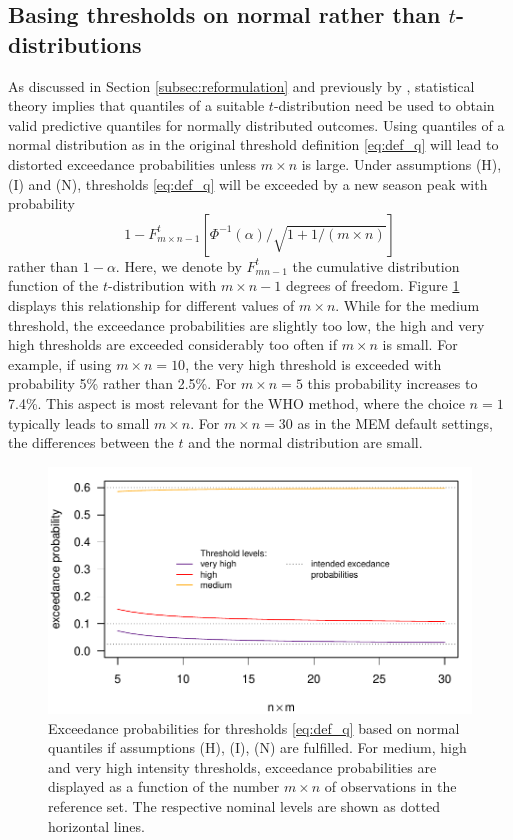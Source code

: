 \documentclass[12pt]{article}
\begin{document}
\subsection{Basing thresholds on normal rather than $t$-distributions}
\label{subsec:normal_vs_t}

As discussed in Section \ref{subsec:reformulation} and previously by \cite{Allevius2020}, statistical theory implies that quantiles of a suitable $t$-distribution need be used to obtain valid predictive quantiles for normally distributed outcomes. Using quantiles of a normal distribution as in the original threshold definition \eqref{eq:def_q} will lead to distorted exceedance probabilities unless $m \times n$ is large. Under assumptions (H), (I) and (N), thresholds \eqref{eq:def_q} will be exceeded by a new season peak with probability
$$
1 - F^t_{m\times n - 1}\left[\Phi^{-1}(\alpha)/\sqrt{1 + 1/(m \times n)}\right]
$$
rather than $1 - \alpha$. Here, we denote by $F^t_{mn - 1}$ the cumulative distribution function of the $t$-distribution with $m \times n - 1$ degrees of freedom. Figure \ref{fig:calibration_t_normal} displays this relationship for different values of $m \times n$. While for the medium threshold, the exceedance probabilities are slightly too low, the high and very high thresholds are exceeded considerably too often if $m \times n$ is small. For example, if using $m \times n = 10$, the very high threshold is exceeded with probability 5\% rather than 2.5\%. For $m \times n = 5$ this probability increases to 7.4\%. This aspect is most relevant for the WHO method, where the choice $n = 1$ typically leads to small $m \times n$. For $m \times n = 30$ as in the MEM default settings, the differences between the $t$ and the normal distribution are small.

\begin{figure}[h!]
\begin{center}
\includegraphics[scale=0.6]{figure/exceedance_prob_normal.pdf}
\end{center}
\caption{Exceedance probabilities for thresholds \eqref{eq:def_q} based on normal quantiles if assumptions (H), (I), (N) are fulfilled. For medium, high and very high intensity thresholds, exceedance probabilities are displayed as a function of the number $m \times n$ of observations in the reference set. The respective nominal levels are shown as dotted horizontal lines.}
\label{fig:calibration_t_normal}
\end{figure}
\end{document}
